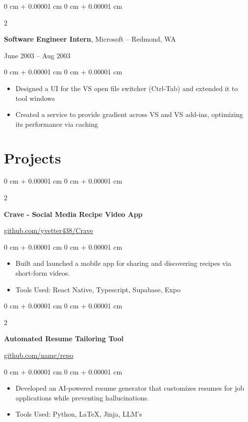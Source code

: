 \documentclass[10pt, letterpaper]{article}
\newenvironment{highlights}{
    \begin{itemize}[
        topsep=0.10 cm,
        parsep=0.10 cm,
        partopsep=0pt,
        itemsep=0pt,
        leftmargin=0 cm + 20pt
    ]
}{
    \end{itemize}
} %
\newenvironment{onecolentry}{
    \begin{adjustwidth}{
        0 cm + 0.00001 cm
    }{
        0 cm + 0.00001 cm
    }
}{
    \end{adjustwidth}
} %
\newenvironment{twocolentry}[2][]{
    \onecolentry
    \def\secondColumn{#2}
    \setcolumnwidth{\fill, 4.5 cm}
    \begin{paracol}{2}
}{
    \switchcolumn \raggedleft \secondColumn
    \end{paracol}
    \endonecolentry
} %
\begin{document}
    \vspace{0.2 cm}

    \begin{twocolentry}{
        June 2003 – Aug 2003
    }
        \textbf{Software Engineer Intern}, Microsoft -- Redmond, WA
    \end{twocolentry}

    \vspace{0.10 cm}
    \begin{onecolentry}
        \begin{highlights}
            \item Designed a UI for the VS open file switcher (Ctrl-Tab) and extended it to tool windows
            \item Created a service to provide gradient across VS and VS add-ins, optimizing its performance via caching
        \end{highlights}
    \end{onecolentry}

    \section{Projects}

    \begin{twocolentry}{
        \href{https://github.com/sinaatalay/rendercv}{github.com/yvetter438/Crave}
    }
        \textbf{Crave - Social Media Recipe Video App}
    \end{twocolentry}

    \vspace{0.10 cm}
    \begin{onecolentry}
        \begin{highlights}
            \item Built and launched a mobile app for sharing and discovering recipes via short-form videos.
            \item Tools Used: React Native, Typescript, Supabase, Expo
        \end{highlights}
    \end{onecolentry}

    \vspace{0.2 cm}

    \begin{twocolentry}{
        \href{https://github.com/sinaatalay/rendercv}{github.com/name/repo}
    }
        \textbf{Automated Resume Tailoring Tool}
    \end{twocolentry}

    \vspace{0.10 cm}
    \begin{onecolentry}
        \begin{highlights}
            \item Developed an AI-powered resume generator that customizes resumes for job applications while preventing hallucinations.
            \item Tools Used: Python, LaTeX, Jinja, LLM's
        \end{highlights}
    \end{onecolentry}
\end{document}
